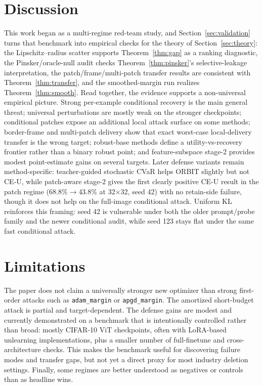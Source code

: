 \documentclass[11pt]{article}
\begin{document}
\section{Discussion}
This work began as a multi-regime red-team study, and Section~\ref{sec:validation} turns that benchmark into empirical checks for the theory of Section~\ref{sec:theory}: the Lipschitz--radius scatter supports Theorem~\ref{thm:gap} as a ranking diagnostic, the Pinsker/oracle-null audit checks Theorem~\ref{thm:pinsker}'s selective-leakage interpretation, the patch/frame/multi-patch transfer results are consistent with Theorem~\ref{thm:transfer}, and the smoothed-margin run realizes Theorem~\ref{thm:smooth}. Read together, the evidence supports a non-universal empirical picture. Strong per-example conditional recovery is the main general threat; universal perturbations are mostly weak on the stronger checkpoints; conditional patches expose an additional local attack surface on some methods; border-frame and multi-patch delivery show that exact worst-case local-delivery transfer is the wrong target; robust-base methods define a utility-vs-recovery frontier rather than a binary robust point; and feature-subspace stage-2 provides modest point-estimate gains on several targets. Later defense variants remain method-specific: teacher-guided stochastic CVaR helps ORBIT slightly but not CE-U, while patch-aware stage-2 gives the first clearly positive CE-U result in the patch regime (68.8\%$\to$43.8\% at 32$\times$32, seed 42) with no retain-side failure, though it does not help on the full-image conditional attack. Uniform KL reinforces this framing: seed 42 is vulnerable under both the older prompt/probe family and the newer conditional audit, while seed 123 stays flat under the same fast conditional attack.


\section{Limitations}
The paper does not claim a universally stronger new optimizer than strong first-order attacks such as \texttt{adam\_margin} or \texttt{apgd\_margin}. The amortized short-budget attack is partial and target-dependent. The defense gains are modest and currently demonstrated on a benchmark that is intentionally controlled rather than broad: mostly CIFAR-10 ViT checkpoints, often with LoRA-based unlearning implementations, plus a smaller number of full-finetune and cross-architecture checks. This makes the benchmark useful for discovering failure modes and transfer gaps, but not yet a direct proxy for most industry deletion settings. Finally, some regimes are better understood as negatives or controls than as headline wins.
\end{document}
